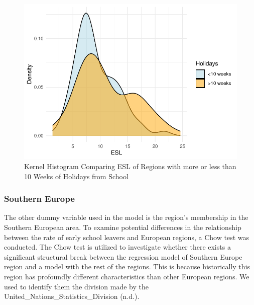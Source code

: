 \documentclass[
  letterpaper,
  DIV=11,
  numbers=noendperiod,
  abstract]{scrartcl}
\begin{document}
\begin{figure}[H]

{\centering \includegraphics[width=1\textwidth,height=\textheight]{report_files/figure-pdf/graph_holydays_gr_10w-1.pdf}

}

\caption{Kernel Histogram Comparing ESL of Regions with more or less
than 10 Weeks of Holidays from School}

\end{figure}%

\subsubsection{Southern Europe}\label{southern-europe}

The other dummy variable used in the model is the region's membership in
the Southern European area. To examine potential differences in the
relationship between the rate of early school leavers and European
regions, a Chow test was conducted. The Chow test is utilized to
investigate whether there exists a significant structural break between
the regression model of Southern Europe region and a model with the rest
of the regions. This is because historically this region has profoundly
different characteristics than other European regions. We used to
identify them the division made by the
United\_Nations\_Statistics\_Division (n.d.).
\end{document}
